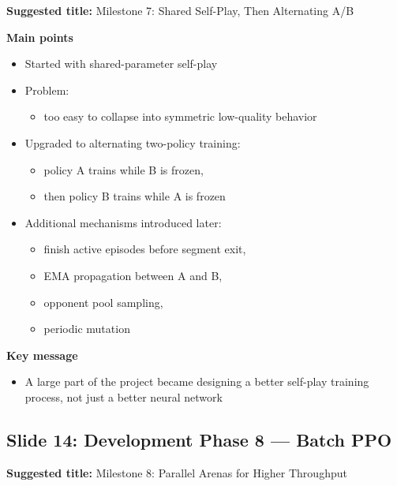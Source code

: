 \documentclass[11pt]{article}
\begin{document}
\textbf{Suggested title:} Milestone 7: Shared Self-Play, Then Alternating A/B

\textbf{Main points}
\begin{itemize}
    \item Started with shared-parameter self-play
    \item Problem:
    \begin{itemize}
        \item too easy to collapse into symmetric low-quality behavior
    \end{itemize}
    \item Upgraded to alternating two-policy training:
    \begin{itemize}
        \item policy A trains while B is frozen,
        \item then policy B trains while A is frozen
    \end{itemize}
    \item Additional mechanisms introduced later:
    \begin{itemize}
        \item finish active episodes before segment exit,
        \item EMA propagation between A and B,
        \item opponent pool sampling,
        \item periodic mutation
    \end{itemize}
\end{itemize}

\textbf{Key message}
\begin{itemize}
    \item A large part of the project became designing a better self-play training process, not just a better neural network
\end{itemize}

\subsection*{Slide 14: Development Phase 8 --- Batch PPO}

\textbf{Suggested title:} Milestone 8: Parallel Arenas for Higher Throughput
\end{document}
